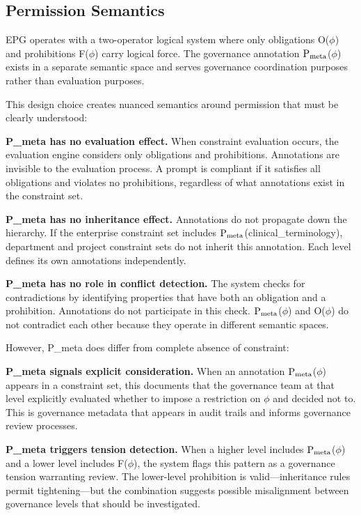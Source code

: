 \subsection{Permission Semantics}


EPG operates with a two-operator logical system where only obligations O($\phi$) and prohibitions F($\phi$) carry logical force. The governance annotation $\mathrm{P_{meta}}$($\phi$) exists in a separate semantic space and serves governance coordination purposes rather than evaluation purposes.

This design choice creates nuanced semantics around permission that must be clearly understood:

\textbf{P\_\allowbreak{}meta has no evaluation effect.} When constraint evaluation occurs, the evaluation engine considers only obligations and prohibitions. Annotations are invisible to the evaluation process. A prompt is compliant if it satisfies all obligations and violates no prohibitions, regardless of what annotations exist in the constraint set.

\textbf{P\_\allowbreak{}meta has no inheritance effect.} Annotations do not propagate down the hierarchy. If the enterprise constraint set includes $\mathrm{P_{meta}}$(clinical\_\allowbreak{}terminology), department and project constraint sets do not inherit this annotation. Each level defines its own annotations independently.

\textbf{P\_\allowbreak{}meta has no role in conflict detection.} The system checks for contradictions by identifying properties that have both an obligation and a prohibition. Annotations do not participate in this check. $\mathrm{P_{meta}}$($\phi$) and O($\phi$) do not contradict each other because they operate in different semantic spaces.

However, P\_\allowbreak{}meta does differ from complete absence of constraint:

\textbf{P\_\allowbreak{}meta signals explicit consideration.} When an annotation $\mathrm{P_{meta}}$($\phi$) appears in a constraint set, this documents that the governance team at that level explicitly evaluated whether to impose a restriction on $\phi$ and decided not to. This is governance metadata that appears in audit trails and informs governance review processes.

\textbf{P\_\allowbreak{}meta triggers tension detection.} When a higher level includes $\mathrm{P_{meta}}$($\phi$) and a lower level includes F($\phi$), the system flags this pattern as a governance tension warranting review. The lower-level prohibition is valid---inheritance rules permit tightening---but the combination suggests possible misalignment between governance levels that should be investigated.


